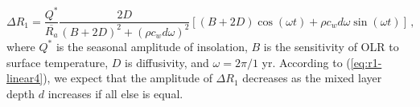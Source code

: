 \documentclass{ametsocV5}
\begin{document}
  \begin{equation} \label{eq:r1-linear4}
    \Delta R_{1} = \frac{Q^{*}}{\overline{R_{a}}}\frac{2D}{(B+2D)^{2}+(\rho c_w d \omega)^{2}}\left[(B+2D)\cos(\omega t)+\rho c_w d \omega \sin(\omega t)\right] \, ,
  \end{equation}
  where $Q^*$ is the seasonal amplitude of insolation, $B$ is the sensitivity of OLR to surface temperature, $D$ is diffusivity, and $\omega=2\pi/1$ yr. According to (\ref{eq:r1-linear4}), we expect that the amplitude of $\Delta R_1$ decreases as the mixed layer depth $d$ increases if all else is equal. 
  
    
  
\end{document}
